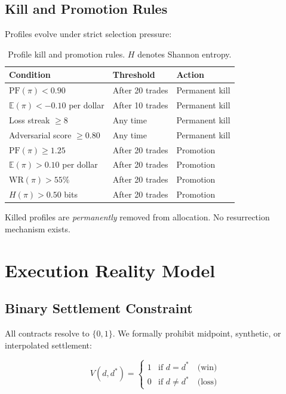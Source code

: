 \documentclass[11pt,a4paper]{article}
\newcommand{\EV}{\mathbb{E}}
\begin{document}
\subsection{Kill and Promotion Rules}

Profiles evolve under strict selection pressure:

\begin{table}[h]
\centering
\begin{tabular}{@{}lll@{}}
\toprule
\textbf{Condition} & \textbf{Threshold} & \textbf{Action} \\
\midrule
$\text{PF}(\pi) < 0.90$ & After 20 trades & Permanent kill \\
$\EV(\pi) < -0.10$ per dollar & After 10 trades & Permanent kill \\
Loss streak $\geq 8$ & Any time & Permanent kill \\
Adversarial score $\geq 0.80$ & Any time & Permanent kill \\
\midrule
$\text{PF}(\pi) \geq 1.25$ & After 20 trades & Promotion \\
$\EV(\pi) > 0.10$ per dollar & After 20 trades & Promotion \\
$\text{WR}(\pi) > 55\%$ & After 20 trades & Promotion \\
$H(\pi) > 0.50$ bits & After 20 trades & Promotion \\
\bottomrule
\end{tabular}
\caption{Profile kill and promotion rules. $H$ denotes Shannon entropy.}
\label{tab:kill_promotion}
\end{table}

Killed profiles are \emph{permanently} removed from allocation. No resurrection mechanism exists.

\section{Execution Reality Model}\label{sec:execution}

\subsection{Binary Settlement Constraint}

All contracts resolve to $\{0, 1\}$. We formally prohibit midpoint, synthetic, or interpolated settlement:

\begin{equation}\label{eq:binary_settlement}
    V(d, d^*) = \begin{cases}
        1 & \text{if } d = d^* \quad \text{(win)} \\
        0 & \text{if } d \neq d^* \quad \text{(loss)}
    \end{cases}
\end{equation}
\end{document}
